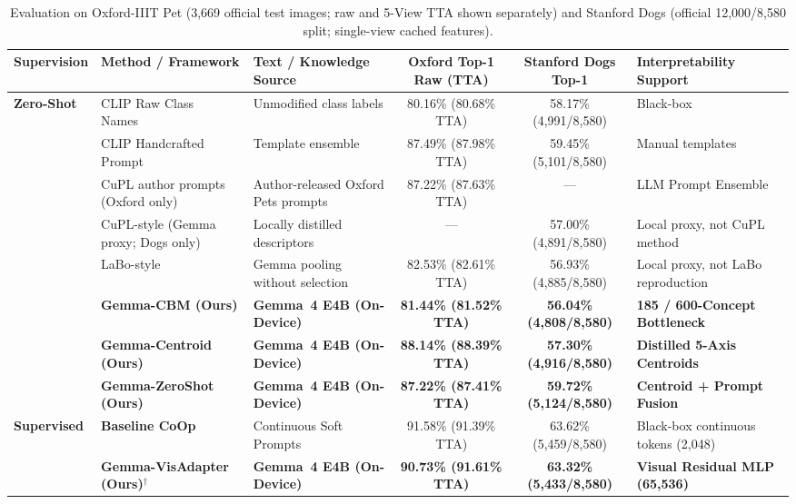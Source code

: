 \documentclass[conference]{IEEEtran}
\begin{document}
\begin{table}[t]
\centering
\caption{Evaluation on Oxford-IIIT Pet (3,669 official test images; raw and 5-View TTA shown separately) and Stanford Dogs (official 12,000/8,580 split; single-view cached features).}
\label{tab:stanford_dogs}
\vspace{2pt}
\footnotesize
\setlength{\tabcolsep}{4pt}
\renewcommand{\arraystretch}{1.05}
\begin{tabularx}{\textwidth}{p{1.8cm} p{3.2cm} p{3.2cm} c c X}
\toprule
\textbf{Supervision} & \textbf{Method / Framework} & \textbf{Text / Knowledge Source} & \textbf{Oxford Top-1 Raw (TTA)} & \textbf{Stanford Dogs Top-1} & \textbf{Interpretability Support} \\
\midrule
\textbf{Zero-Shot} & CLIP Raw Class Names~\cite{radford2021learning} & Unmodified class labels & 80.16\% (80.68\% TTA) & 58.17\% (4,991/8,580) & Black-box \\
& CLIP Handcrafted Prompt & Template ensemble~\cite{radford2021learning} & 87.49\% (87.98\% TTA) & 59.45\% (5,101/8,580) & Manual templates \\
& CuPL author prompts~\cite{pratt2023what} (Oxford only) & Author-released Oxford Pets prompts & 87.22\% (87.63\% TTA) & --- & LLM Prompt Ensemble \\
& CuPL-style (Gemma proxy; Dogs only) & Locally distilled descriptors & --- & 57.00\% (4,891/8,580) & Local proxy, not CuPL method \\
& LaBo-style~\cite{yang2023language} & Gemma pooling without selection & 82.53\% (82.61\% TTA) & 56.93\% (4,885/8,580) & Local proxy, not LaBo reproduction \\
& \textbf{Gemma-CBM (Ours)} & \textbf{Gemma~4 E4B (On-Device)} & \textbf{81.44\% (81.52\% TTA)} & \textbf{56.04\% (4,808/8,580)} & \textbf{185 / 600-Concept Bottleneck} \\
& \textbf{Gemma-Centroid (Ours)} & \textbf{Gemma~4 E4B (On-Device)} & \textbf{88.14\% (88.39\% TTA)} & \textbf{57.30\% (4,916/8,580)} & \textbf{Distilled 5-Axis Centroids} \\
& \textbf{Gemma-ZeroShot (Ours)} & \textbf{Gemma~4 E4B (On-Device)} & \textbf{87.22\% (87.41\% TTA)} & \textbf{59.72\% (5,124/8,580)} & \textbf{Centroid + Prompt Fusion} \\
\midrule
\textbf{Supervised} & \textbf{Baseline CoOp}~\cite{zhou2022learning} & Continuous Soft Prompts & 91.58\% (91.39\% TTA) & 63.62\% (5,459/8,580) & Black-box continuous tokens (2,048) \\
& \textbf{Gemma-VisAdapter (Ours)}$^{\dag}$ & \textbf{Gemma~4 E4B (On-Device)} & \textbf{90.73\% (91.61\% TTA)} & \textbf{63.32\% (5,433/8,580)} & \textbf{Visual Residual MLP (65,536)} \\

\end{tabularx}
\end{table}
\end{document}
